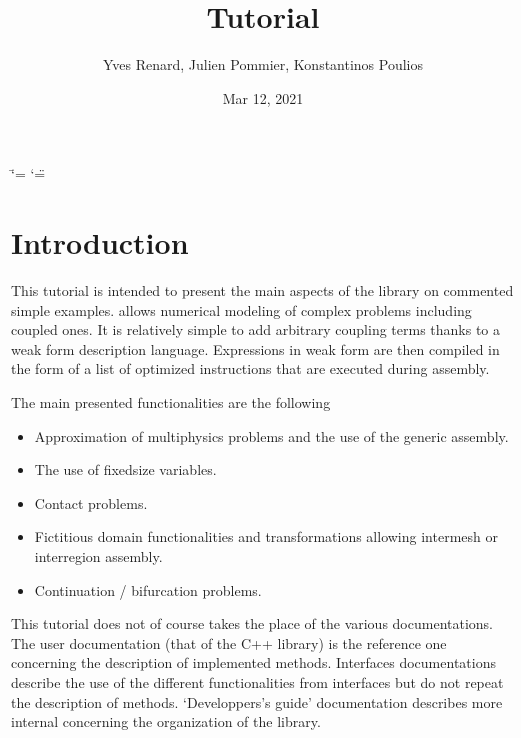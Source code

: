 \documentclass[a4paper,11pt,english]{sphinxmanual}
\title{Tutorial}
\date{Mar 12, 2021}
\author{Yves Renard, Julien Pommier, Konstantinos Poulios}
\begin{document}
\ifdefined\shorthandoff
  \ifnum\catcode`\=\string=\active\shorthandoff{=}\fi
  \ifnum\catcode`\"=\active{}\fi
\fi

\pagestyle{empty}
\sphinxmaketitle
\pagestyle{plain}
\sphinxtableofcontents
\pagestyle{normal}
\label{\detokenize{tutorial/index::doc}}



\chapter{Introduction}
\label{\detokenize{tutorial/intro:introduction}}\label{\detokenize{tutorial/intro:ud-intro-tut}}\label{\detokenize{tutorial/intro::doc}}
\sphinxAtStartPar
This tutorial is intended to present the main aspects of the  library  on commented simple examples.  allows numerical modeling of complex problems including coupled ones. It is relatively simple to add arbitrary coupling terms thanks to a weak form description language. Expressions in weak form are then compiled in the form of a list of optimized instructions that are executed during assembly.

\sphinxAtStartPar
The main presented functionalities are the following
\begin{itemize}
\item {} 
\sphinxAtStartPar
Approximation of multiphysics problems and the use of the generic assembly.

\item {} 
\sphinxAtStartPar
The use of fixed\sphinxhyphen{}size variables.

\item {} 
\sphinxAtStartPar
Contact problems.

\item {} 
\sphinxAtStartPar
Fictitious domain functionalities and transformations allowing inter\sphinxhyphen{}mesh or inter\sphinxhyphen{}region assembly.

\item {} 
\sphinxAtStartPar
Continuation / bifurcation problems.

\end{itemize}

\sphinxAtStartPar
This tutorial does not of course takes the place of the various documentations. The user documentation (that of the C++ library) is the reference one concerning the description of implemented methods. Interfaces documentations describe the use of the different functionalities from interfaces but do not repeat the description of methods. ‘Developpers’s guide’ documentation describes more internal concerning the organization of the library.
\end{document}
